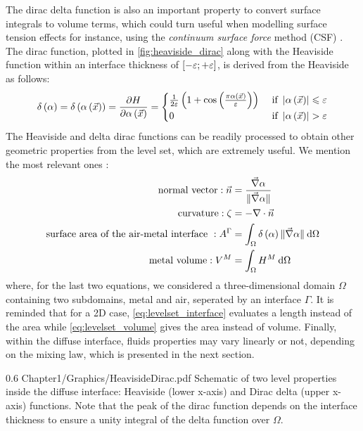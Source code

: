 The dirac delta function is also an important property to convert surface integrals to volume terms, which could
turn useful when modelling surface tension effects for instance, using 
the \emph{continuum surface force} method (CSF) \citep{brackbill_continuum_1992}.
The dirac function, plotted in \cref{fig:heaviside_dirac} along with the Heaviside function within an interface thickness 
of $\left[ -\varepsilon;+\varepsilon \right]$, is derived from the Heaviside as follows:
\begin{align}
\label{eq:dirac}
\delta \left( \alpha \right) = \delta \left( \alpha \left( \vec{x} \right) \right) = \frac{\partial H  }{\partial \alpha \left( \vec{x} \right)}=
\begin{cases}
\frac{1}{2\varepsilon} \left(  1 + \cos \left( \frac{\pi \alpha \left( \vec{x} \right)}{\varepsilon } \right)  \right)  & \text{ if } \left | \alpha \left( \vec{x} \right) \right | \leqslant  \varepsilon \\
    0  & \text{ if } \left | \alpha \left( \vec{x} \right) \right | > \varepsilon
\end{cases}
\end{align}
The Heaviside and delta dirac functions can be readily processed to obtain other geometric properties from the level set,
which are extremely useful. We mention the most relevant ones \citep{peng_pde-based_1999}:
\begin{align}
\label{eq:levelset_normal}
\text{normal vector}: \vec{n} &= \frac{\nabvec \levelset}{\norm{\nabvec \levelset} } \\
%
\label{eq:levelset_curvature}
\text{curvature}: \zeta &= - \nabla \cdot \vec{n} \\
%
\label{eq:levelset_interface}
\text{surface area of the air-metal interface }: A^\Gamma &= \integral{\Omega}{\dirac \norm{\nabvec \levelset}}{\Omega} \\
%
\label{eq:levelset_volume}
\text{metal volume}: V^M &= \integral{\Omega}{\heaviside^M}{\Omega}
%
\end{align}
where, for the last two equations, we considered a three-dimensional domain $\Omega$ containing two subdomains, metal and air, seperated by an interface $\Gamma$.
It is reminded that for a 2D case, \cref{eq:levelset_interface} evaluates a length instead of the area while \cref{eq:levelset_volume} gives the area instead of volume.
Finally, within the diffuse interface, fluids properties 
may vary linearly or not, depending on the mixing law, which is presented in the next section.
\begin{figureth}
{0.6}
{Chapter1/Graphics/HeavisideDirac.pdf}
{Schematic of two level properties inside the diffuse interface: Heaviside (lower x-axis) and Dirac delta (upper x-axis) functions.
Note that the peak of the dirac function depends on the interface thickness to ensure a unity integral of the delta function over $\Omega$. }
\label{fig:heaviside_dirac}
\end{figureth}
%
